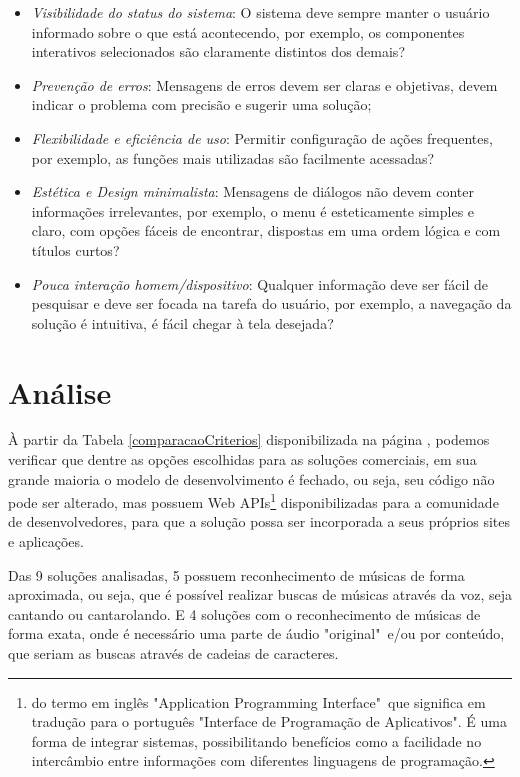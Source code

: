 \begin{itemize}
    \begin{itemize}
        \item \textit{Visibilidade do status do sistema}: O sistema deve sempre manter o usuário informado sobre o que está acontecendo, por exemplo, os componentes interativos selecionados são claramente distintos dos demais?
        \item \textit{Prevenção de erros}: Mensagens de erros devem ser claras e objetivas, devem indicar o problema com precisão e sugerir uma solução;
        \item \textit{Flexibilidade e eficiência de uso}: Permitir configuração de ações frequentes, por exemplo, as funções mais utilizadas são facilmente acessadas?
        \item \textit{Estética e Design minimalista}: Mensagens de diálogos não devem conter informações irrelevantes, por exemplo, o menu é esteticamente simples e claro, com opções fáceis de encontrar, dispostas em uma ordem lógica e com títulos curtos?
        \item \textit{Pouca interação homem/dispositivo}: Qualquer informação deve ser fácil de pesquisar e deve ser focada na tarefa do usuário, por exemplo, a navegação da solução é intuitiva, é fácil chegar à tela desejada?
    \end{itemize}
\end{itemize}

\section{Análise}

À partir da Tabela \ref{comparacaoCriterios} disponibilizada na página \pageref{comparacaoCriterios}, podemos verificar que dentre as opções escolhidas para as soluções comerciais, em sua grande maioria o modelo de desenvolvimento é fechado, ou seja, seu código não pode ser alterado, mas possuem Web APIs\footnote{do termo em inglês "Application Programming Interface"\ que significa em tradução para o português "Interface de Programação de Aplicativos". É uma forma de integrar sistemas, possibilitando benefícios como a facilidade no intercâmbio entre informações com diferentes linguagens de programação.} disponibilizadas para a comunidade de desenvolvedores, para que a solução possa ser incorporada a seus próprios sites e aplicações.

Das 9 soluções analisadas, 5 possuem reconhecimento de músicas de forma aproximada, ou seja, que é possível realizar buscas de músicas através da voz, seja cantando ou cantarolando. E 4 soluções com o reconhecimento de músicas de forma exata, onde é necessário uma parte de áudio "original"\ e/ou por conteúdo, que seriam as buscas através de cadeias de caracteres.

